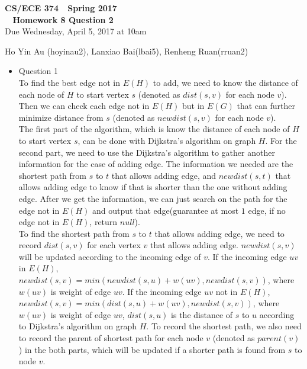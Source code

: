 \documentclass[11pt]{article}
\begin{document}
\begin{center}
\Large\textbf{CS/ECE 374 \,\decosix\,  Spring 2017}%
\\
\LARGE\textbf{\decothreeleft~ Homework 8 Question 2 ~\decothreeright}%
\\[0.5ex]
\large Due Wednesday, April 5, 2017 at 10am
\end{center}

\begin{center}


\begin{Large}
Ho Yin Au (hoyinau2), Lanxiao Bai(lbai5), Renheng Ruan(rruan2)
\end{Large}
\end{center}

\begin{itemize}
	\item	Question 1\\
	To find the best edge not in $E(H)$ to add, we need to know the distance of each node of $H$ to start vertex $s$ (denoted as $dist(s,v)$ for each node $v$). Then we can check each edge not in $E(H)$ but in $E(G)$ that can further minimize distance from $s$ (denoted as $newdist(s,v)$ for each node $v$).\\
	The first part of the algorithm, which is know the distance of each node of $H$ to start vertex $s$, can be done with Dijkstra's algorithm on graph $H$. For the second part, we need to use the Dijkstra's algorithm to gather another information for the case of adding edge. The information we needed are the shortest path from $s$ to $t$ that allows adding edge, and $newdist(s,t)$ that allows adding edge to know if that is shorter than the one without adding edge. After we get the information, we can just search on the path for the edge not in $E(H)$ and output that edge(guarantee at most $1$ edge, if no edge not in $E(H)$, return $null$).\\
	To find the shortest path from $s$ to $t$ that allows adding edge, we need to record $dist(s,v)$ for each vertex $v$ that allows adding edge. $newdist(s,v)$ will be updated according to the incoming edge of $v$. If the incoming edge $uv$ in $E(H)$, $newdist(s,v) = min(newdist(s,u) + w(uv), newdist(s,v))$, where $w(uv)$ is weight of edge $uv$. If the incoming edge $uv$ not in $E(H)$, $newdist(s,v) = min(dist(s,u) + w(uv), newdist(s,v))$, where $w(uv)$ is weight of edge $uv$, $dist(s,u)$ is the distance of $s$ to $u$ according to Dijkstra's algorithm on graph $H$. To record the shortest path, we also need to record the parent of shortest path for each node $v$ (denoted as $parent(v)$) in the both parts, which will be updated if a shorter path is found from $s$ to node $v$.\\

\end{itemize}
\end{document}
